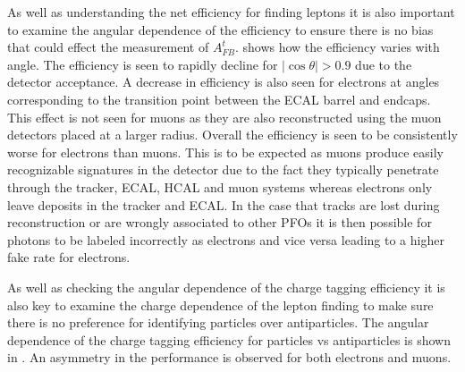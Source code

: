 As well as understanding the net efficiency for finding leptons it is also important to examine the angular dependence of the efficiency to ensure there is no bias that could effect the measurement of $A_{FB}^{t}$.  shows how the efficiency varies with angle. The efficiency is seen to rapidly decline for $|\cos\theta| > 0.9$ due to the detector acceptance. A decrease in efficiency is also seen for electrons at angles corresponding to the transition point between the ECAL barrel and endcaps. This effect is not seen for muons as they are also reconstructed using the muon detectors placed at a larger radius. Overall the efficiency is seen to be consistently worse for electrons than muons. This is to be expected as muons produce easily recognizable signatures in the detector due to the fact they typically penetrate through the tracker, ECAL, HCAL and muon systems whereas electrons only leave deposits in the tracker and ECAL. In the case that tracks are lost during reconstruction or are wrongly associated to other PFOs it is then possible for photons to be labeled incorrectly as electrons and vice versa leading to a higher fake rate for electrons.

As well as checking the angular dependence of the charge tagging efficiency it is also key to examine the charge dependence of the lepton finding to make sure there is no preference for identifying particles over antiparticles. The angular dependence of the charge tagging efficiency for particles vs antiparticles is shown in . An asymmetry in the performance is observed for both electrons and muons.

